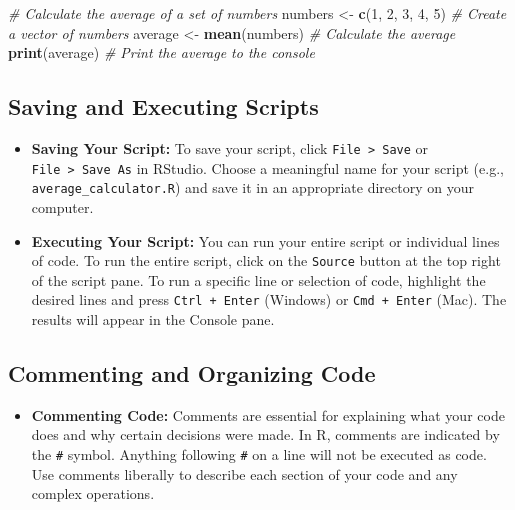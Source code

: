 \documentclass[
]{book}
\newenvironment{Shaded}{\begin{snugshade}}{\end{snugshade}}
\newcommand{\CommentTok}[1]{\textcolor[rgb]{0.56,0.35,0.01}{\textit{#1}}}
\newcommand{\DecValTok}[1]{\textcolor[rgb]{0.00,0.00,0.81}{#1}}
\newcommand{\FunctionTok}[1]{\textcolor[rgb]{0.13,0.29,0.53}{\textbf{#1}}}
\newcommand{\NormalTok}[1]{#1}
\newcommand{\OtherTok}[1]{\textcolor[rgb]{0.56,0.35,0.01}{#1}}
\providecommand{\tightlist}{%
  \setlength{\itemsep}{0pt}\setlength{\parskip}{0pt}}
\begin{document}
\begin{Shaded}
\begin{Highlighting}[]
\CommentTok{\# Calculate the average of a set of numbers}
\NormalTok{numbers }\OtherTok{\textless{}{-}} \FunctionTok{c}\NormalTok{(}\DecValTok{1}\NormalTok{, }\DecValTok{2}\NormalTok{, }\DecValTok{3}\NormalTok{, }\DecValTok{4}\NormalTok{, }\DecValTok{5}\NormalTok{) }\CommentTok{\# Create a vector of numbers}
\NormalTok{average }\OtherTok{\textless{}{-}} \FunctionTok{mean}\NormalTok{(numbers) }\CommentTok{\# Calculate the average}
\FunctionTok{print}\NormalTok{(average) }\CommentTok{\# Print the average to the console}
\end{Highlighting}
\end{Shaded}

\subsection*{Saving and Executing Scripts}\label{saving-and-executing-scripts}

\begin{itemize}
\item
  \textbf{Saving Your Script:} To save your script, click \texttt{File\ \textgreater{}\ Save} or \texttt{File\ \textgreater{}\ Save\ As} in RStudio. Choose a meaningful name for your script (e.g., \texttt{average\_calculator.R}) and save it in an appropriate directory on your computer.
\item
  \textbf{Executing Your Script:} You can run your entire script or individual lines of code. To run the entire script, click on the \texttt{Source} button at the top right of the script pane. To run a specific line or selection of code, highlight the desired lines and press \texttt{Ctrl\ +\ Enter} (Windows) or \texttt{Cmd\ +\ Enter} (Mac). The results will appear in the Console pane.
\end{itemize}

\subsection*{Commenting and Organizing Code}\label{commenting-and-organizing-code}

\begin{itemize}
\tightlist
\item
  \textbf{Commenting Code:} Comments are essential for explaining what your code does and why certain decisions were made. In R, comments are indicated by the \texttt{\#} symbol. Anything following \texttt{\#} on a line will not be executed as code. Use comments liberally to describe each section of your code and any complex operations.
\end{itemize}
\end{document}
